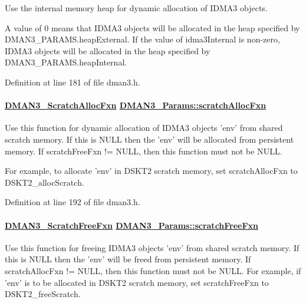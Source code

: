Use the internal memory heap for dynamic allocation of IDMA3 objects.

A value of 0 means that IDMA3 objects will be allocated in the heap specified by DMAN3\_\-PARAMS.heap\-External. If the value of idma3Internal is non-zero, IDMA3 objects will be allocated in the heap specified by DMAN3\_\-PARAMS.heap\-Internal. 

Definition at line 181 of file dman3.h.\hypertarget{struct_d_m_a_n3___params_5fd92c4be106cf2614490abffdd09b60}{
\paragraph[scratchAllocFxn]{\setlength{\rightskip}{0pt plus 5cm}\hyperlink{group___d_s_p_d_m_a_n3_gb88a4f4fc347844728e7c0d6b46c5ecf}{DMAN3\_\-Scratch\-Alloc\-Fxn} \hyperlink{struct_d_m_a_n3___params_5fd92c4be106cf2614490abffdd09b60}{DMAN3\_\-Params::scratch\-Alloc\-Fxn}}\hfill}
\label{struct_d_m_a_n3___params_5fd92c4be106cf2614490abffdd09b60}


Use this function for dynamic allocation of IDMA3 objects 'env' from shared scratch memory. If this is NULL then the 'env' will be allocated from persistent memory. If scratch\-Free\-Fxn != NULL, then this function must not be NULL.

For example, to allocate 'env' in DSKT2 scratch memory, set scratch\-Alloc\-Fxn to DSKT2\_\-alloc\-Scratch. 

Definition at line 192 of file dman3.h.\hypertarget{struct_d_m_a_n3___params_383ff9a30cfc36cb8ab0b0d8a4701fce}{
\paragraph[scratchFreeFxn]{\setlength{\rightskip}{0pt plus 5cm}\hyperlink{group___d_s_p_d_m_a_n3_g5c51dee2c06d775005a8cf4db004782f}{DMAN3\_\-Scratch\-Free\-Fxn} \hyperlink{struct_d_m_a_n3___params_383ff9a30cfc36cb8ab0b0d8a4701fce}{DMAN3\_\-Params::scratch\-Free\-Fxn}}\hfill}
\label{struct_d_m_a_n3___params_383ff9a30cfc36cb8ab0b0d8a4701fce}


Use this function for freeing IDMA3 objects 'env' from shared scratch memory. If this is NULL then the 'env' will be freed from persistent memory. If scratch\-Alloc\-Fxn != NULL, then this function must not be NULL. For example, if 'env' is to be allocated in DSKT2 scratch memory, set scratch\-Free\-Fxn to DSKT2\_\-free\-Scratch. 

